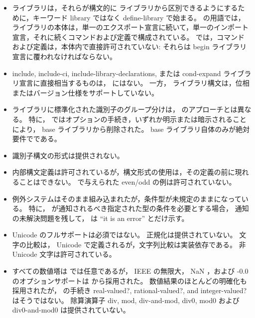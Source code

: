 \begin{itemize}
\item \rsevenrs ライブラリは，それらが構文的に \rsixrs ライブラリから区別できるようにするために，キーワード {\cf library} ではなく {\cf define-library} で始まる。
\rsevenrs の用語では， \rsixrs ライブラリの本体は，単一のエクスポート宣言に続いて，単一のインポート宣言，それに続くコマンドおよび定義で構成されている。
\rsevenrs では，コマンドおよび定義は，本体内で直接許可されていない: それらは {\cf begin} ライブラリ宣言に覆われなければならない。

\item {\cf include}, {\cf include-ci}, {\cf include-library-declarations}, または {\cf cond-expand} ライブラリ宣言に直接相当するものは， \rsixrs にはない。
一方， \rsevenrs ライブラリ構文は，位相またはバージョン仕様をサポートしていない。

\item ライブラリに標準化された識別子のグループ分けは， \rsixrs のアプローチとは異なる。
特に， \rfivers ではオプションの手続き，いずれか明示または暗示されることにより， base ライブラリから削除された。
base ライブラリ自体のみが絶対要件でである。

\item 識別子構文の形式は提供されない。

\item 内部構文定義は許可されているが，構文形式の使用は，その定義の前に現れることはできない。
\rsixrs で与えられた {\cf even}/{\cf odd} の例は許可されていない。

\item \rsixrs 例外システムはそのまま組み込まれたが，条件型が未規定のままになっている。
特に， \rsixrs が通知されるべき指定された型の条件を必要とする場合，
通知の未解決問題を残して， \rsevenrs は ``it is an error'' とだけ示す。

\item Unicode のフルサポートは必須ではない。
正規化は提供されていない。
文字の比較は， Unicode で定義されるが，文字列比較は実装依存である。
非 Unicode 文字は許可されている。

\item すべての数値塔は \rfivers では任意であるが， IEEE の無限大， NaN ，および {\mbox -0.0} のオプションサポートは \rsixrs から採用された。
数値結果のほとんどの明確化も採用されたが， \rsixrs の手続き {\cf real-valued?}, {\cf rational-valued?}, and {\cf integer-valued?} はそうではない。
\rsixrs 除算演算子 {\cf div}, {\cf mod}, {\cf div-and-mod}, {\cf div0}, {\cf mod0} および {\cf div0-and-mod0} は提供されていない。


\end{itemize}
